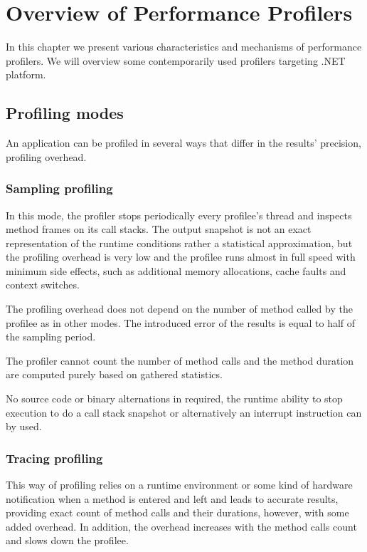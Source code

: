 \chapter{Overview of Performance Profilers }

In this chapter we present various characteristics and mechanisms of performance profilers. We will overview some contemporarily used profilers targeting .NET platform.

\label{01ProfModes}
\section{Profiling modes}
An application can be profiled in several ways that differ in the results' precision, profiling overhead. 

\subsection{Sampling profiling}
In this mode, the profiler stops periodically every profilee's thread and inspects method frames on its call stacks. The output snapshot is not an exact representation of the runtime conditions rather a statistical approximation, but the profiling overhead is very low and the profilee runs almost in full speed with minimum side effects, such as additional memory allocations, cache faults and context switches.

The profiling overhead does not depend on the number of method called by the profilee as in other modes. The introduced error of the results is equal to half of the sampling period.

The profiler cannot count the number of method calls and the method duration are computed purely based on gathered statistics. 

No source code or binary alternations in required, the runtime ability to stop execution to do a call stack snapshot or alternatively an interrupt instruction can by used.

\subsection{Tracing profiling}
This way of profiling relies on a runtime environment or some kind of hardware notification when a method is entered and left and leads to accurate results, providing exact count of method calls and their durations, however, with some added overhead. In addition, the overhead increases with the method calls count and slows down the profilee.

